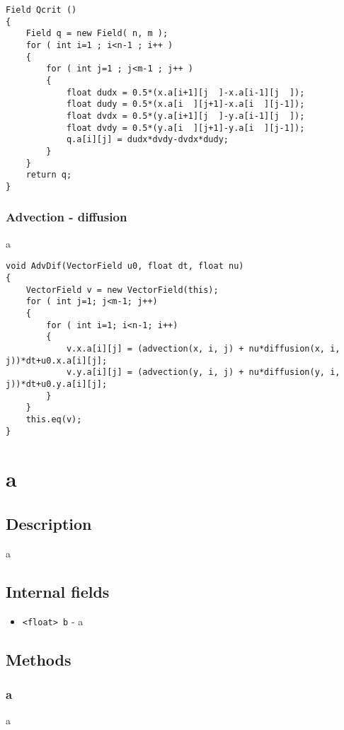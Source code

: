 \documentclass[notitlepage]{article}
\begin{document}
\begin{lstlisting}[style=myCpp]
Field Qcrit ()
{
	Field q = new Field( n, m );
	for ( int i=1 ; i<n-1 ; i++ )
	{
		for ( int j=1 ; j<m-1 ; j++ )
		{
			float dudx = 0.5*(x.a[i+1][j  ]-x.a[i-1][j  ]);
			float dudy = 0.5*(x.a[i  ][j+1]-x.a[i  ][j-1]);
			float dvdx = 0.5*(y.a[i+1][j  ]-y.a[i-1][j  ]);
			float dvdy = 0.5*(y.a[i  ][j+1]-y.a[i  ][j-1]);
			q.a[i][j] = dudx*dvdy-dvdx*dudy;
		}
	}
	return q;
}
\end{lstlisting}

\subsubsection{Advection - diffusion}

a

\begin{lstlisting}[style=myCpp]
void AdvDif(VectorField u0, float dt, float nu)
{
	VectorField v = new VectorField(this);
	for ( int j=1; j<m-1; j++)
	{
		for ( int i=1; i<n-1; i++)
		{
			v.x.a[i][j] = (advection(x, i, j) + nu*diffusion(x, i, j))*dt+u0.x.a[i][j];
			v.y.a[i][j] = (advection(y, i, j) + nu*diffusion(y, i, j))*dt+u0.y.a[i][j];
		}
	}
	this.eq(v);   
}
\end{lstlisting}

\section{a}

\subsection{Description}

a

\subsection{Internal fields}

\begin{itemize}
\item \texttt{<float> b} - a
\end{itemize}

\subsection{Methods}

\subsubsection{a}

a
\end{document}
